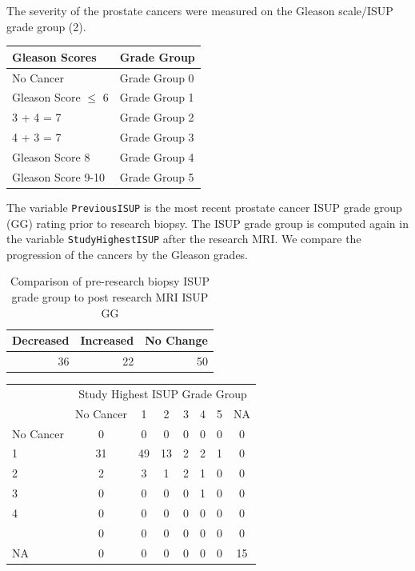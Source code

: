 \documentclass[]{article}
\begin{document}
The severity of the prostate cancers were measured on the Gleason scale/ISUP grade group (2).

\begin{longtable}[]{@{}ll@{}}
\toprule
Gleason Scores & Grade Group\tabularnewline
\midrule
\endhead
No Cancer & Grade Group 0\tabularnewline
Gleason Score \(\leq\) 6 & Grade Group 1\tabularnewline
3 + 4 = 7 & Grade Group 2\tabularnewline
4 + 3 = 7 & Grade Group 3\tabularnewline
Gleason Score 8 & Grade Group 4\tabularnewline
Gleason Score 9-10 & Grade Group 5\tabularnewline
\bottomrule
\end{longtable}

The variable \texttt{PreviousISUP} is the most recent prostate cancer ISUP grade group (GG) rating prior to research biopsy.
The ISUP grade group is computed again in the variable \texttt{StudyHighestISUP} after the research MRI.
We compare the progression of the cancers by the Gleason grades.

\begin{table}

\caption{\label{tab:unnamed-chunk-1}Comparison of pre-research biopsy ISUP grade group to post research MRI ISUP GG}
\centering
\begin{tabular}[t]{r|r|r}
\hline
Decreased & Increased & No Change\\
\hline
36 & 22 & 50\\
\hline
\end{tabular}
\end{table}

\begin{table}[H]
\centering
\begin{tabular}{lccccccc}
\toprule
\multicolumn{1}{c}{ } & \multicolumn{7}{c}{Study Highest ISUP Grade Group } \\
\cmidrule(l{3pt}r{3pt}){2-8}
  & No Cancer & 1 & 2 & 3 & 4 & 5 & NA\\
\midrule
No Cancer & 0 & 0 & 0 & 0 & 0 & 0 & 0\\
1 & 31 & 49 & 13 & 2 & 2 & 1 & 0\\
2 & 2 & 3 & 1 & 2 & 1 & 0 & 0\\
3 & 0 & 0 & 0 & 0 & 1 & 0 & 0\\
4 & 0 & 0 & 0 & 0 & 0 & 0 & 0\\
\addlinespace
5 & 0 & 0 & 0 & 0 & 0 & 0 & 0\\
NA & 0 & 0 & 0 & 0 & 0 & 0 & 15\\
\bottomrule
\end{tabular}
\end{table}
\end{document}
